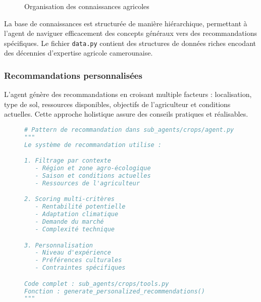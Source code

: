 \begin{figure}[h]
\centering
{}
\caption{Organisation des connaissances agricoles}
\end{figure}

La base de connaissances est structurée de manière hiérarchique, permettant à l'agent de naviguer efficacement des concepts généraux vers des recommandations spécifiques. Le fichier \texttt{data.py} contient des structures de données riches encodant des décennies d'expertise agricole camerounaise.

\subsubsection{Recommandations personnalisées}

L'agent génère des recommandations en croisant multiple facteurs : localisation, type de sol, ressources disponibles, objectifs de l'agriculteur et conditions actuelles. Cette approche holistique assure des conseils pratiques et réalisables.

\begin{figure}[h]
\centering
\begin{lstlisting}[language=Python, caption=Système de recommandation (concept)]
# Pattern de recommandation dans sub_agents/crops/agent.py
"""
Le système de recommandation utilise :

1. Filtrage par contexte
   - Région et zone agro-écologique
   - Saison et conditions actuelles
   - Ressources de l'agriculteur

2. Scoring multi-critères
   - Rentabilité potentielle
   - Adaptation climatique
   - Demande du marché
   - Complexité technique

3. Personnalisation
   - Niveau d'expérience
   - Préférences culturales
   - Contraintes spécifiques

Code complet : sub_agents/crops/tools.py
Fonction : generate_personalized_recommendations()
"""
\end{lstlisting}
\end{figure}


